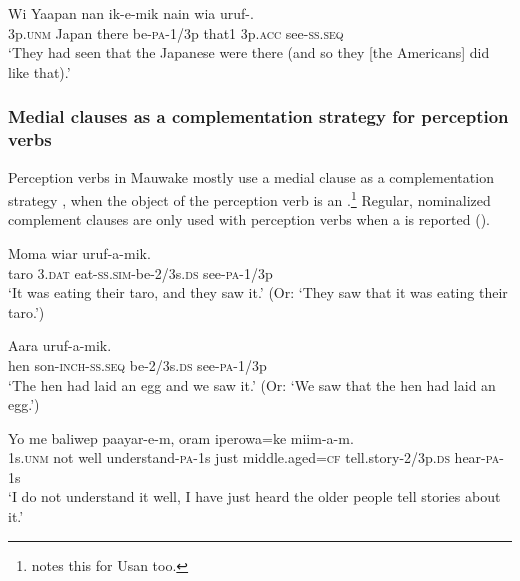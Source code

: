 \ea%
\label{ex:8:x1499}
\gll Wi  Yaapan  nan  ik-e-mik  nain  wia  uruf-.  \\
3p.\textsc{unm} Japan  there  be-\textsc{pa}-1/3p  that1  3p.\textsc{acc} see-\textsc{ss}.\textsc{seq}\\
\glt`They had seen that the Japanese were there (and so they [the Americans] did like that).'
\z


\subsubsection{Medial clauses as a complementation strategy for perception verbs} \label{sec:8.2.3.4}

Perception verbs in Mauwake mostly use a medial clause as a complementation strategy \citep[371]{Dixon2010}, when the object of the perception verb is an .\footnote{\citet[237]{Reesink1983} notes this for Usan too.} Regular, nominalized complement clauses are only used with perception verbs when a  is reported ().

\ea%
\label{ex:8:x1509}
\gll Moma  wiar    uruf-a-mik. \\
taro  3.\textsc{dat} eat-\textsc{ss}.\textsc{sim}-be-2/3s.\textsc{ds}  see-\textsc{pa}-1/3p      \\
\glt`It was eating their taro, and they saw it.' (Or: `They saw that it was eating their taro.')
\z


\ea%
\label{ex:8:x1510}
\gll Aara    uruf-a-mik.\\
hen  son-\textsc{inch}-\textsc{ss}.\textsc{seq} be-2/3s.\textsc{ds} see-\textsc{pa}-1/3p\\
\glt`The hen had laid an egg and we saw it.' (Or: `We saw that the hen had laid an egg.')
\z


\ea%
\label{ex:8:x1511}
\gll Yo  me  baliwep  paayar-e-m,  oram  iperowa=ke \textstyleEmphasizedVernacularWords{-}  miim-a-m.\\
1s.\textsc{unm} not  well  understand-\textsc{pa}-1s  just  middle.aged=\textsc{cf} tell.story-2/3p.\textsc{ds} hear-\textsc{pa}-1s     \\
\glt`I do not understand it well, I have just heard the older people tell stories about it.'
\z


